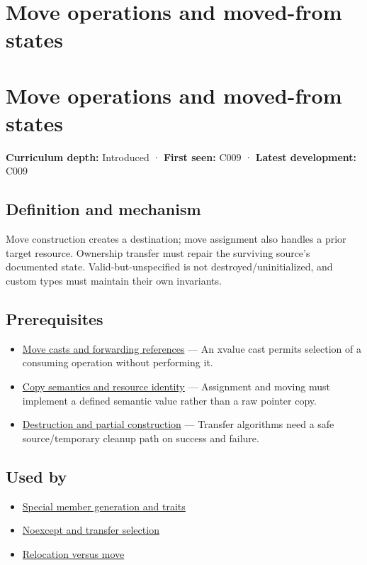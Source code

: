 \hypertarget{appendix-5636651017c2}{}
\section*{Move operations and moved-from states}
\section{Move operations and moved-from states}\label{move-operations-and-moved-from-states}

\textbf{Curriculum depth:} Introduced · \textbf{First seen:} C009 · \textbf{Latest development:} C009

\subsection{Definition and mechanism}\label{definition-and-mechanism}

Move construction creates a destination; move assignment also handles a prior target resource. Ownership transfer must repair the surviving source's documented state. Valid-but-unspecified is not destroyed/uninitialized, and custom types must maintain their own invariants.

\subsection{Prerequisites}\label{prerequisites}

\begin{itemize}
\tightlist
\item
  \hyperref[appendix-0104b704fb11]{Move casts and forwarding references} --- An xvalue cast permits selection of a consuming operation without performing it.
\item
  \hyperref[appendix-1340cd1ce582]{Copy semantics and resource identity} --- Assignment and moving must implement a defined semantic value rather than a raw pointer copy.
\item
  \hyperref[appendix-9bfe377cef7a]{Destruction and partial construction} --- Transfer algorithms need a safe source/temporary cleanup path on success and failure.
\end{itemize}

\subsection{Used by}\label{used-by}

\begin{itemize}
\tightlist
\item
  \hyperref[appendix-42e02a12c694]{Special member generation and traits}
\item
  \hyperref[appendix-c746afaa47d1]{Noexcept and transfer selection}
\item
  \hyperref[appendix-adfd6397af8d]{Relocation versus move}
\end{itemize}

